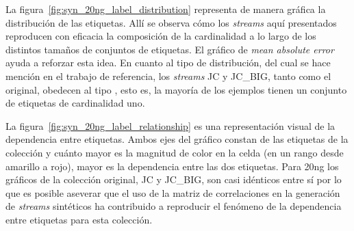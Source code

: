 La figura~\ref{fig:syn_20ng_label_distribution} representa de manera gráfica la
distribución de las etiquetas. Allí se observa cómo los \textit{streams} aquí
presentados reproducen con eficacia la composición de la cardinalidad a lo largo
de los distintos tamaños de conjuntos de etiquetas. El gráfico de \textit{mean
	absolute error} ayuda a reforzar esta idea. En cuanto al tipo de distribución,
del cual se hace mención en el trabajo de referencia, los \textit{streams} JC y
JC\_BIG, tanto como el original, obedecen al tipo , esto es, la
mayoría de los ejemplos tienen un conjunto de etiquetas de cardinalidad uno.

La figura~\ref{fig:syn_20ng_label_relationship} es una representación visual de
la dependencia entre etiquetas. Ambos ejes del gráfico constan de las etiquetas
de la colección y cuánto mayor es la magnitud de color en la celda (en un rango
desde amarillo a rojo), mayor es la dependencia entre las dos etiquetas. Para
20ng los gráficos de la colección original, JC y JC\_BIG, son casi idénticos
entre sí por lo que es posible aseverar que el uso de la matriz de correlaciones
en la generación de \textit{streams} sintéticos ha contribuido a reproducir el
fenómeno de la dependencia entre etiquetas para esta colección.

